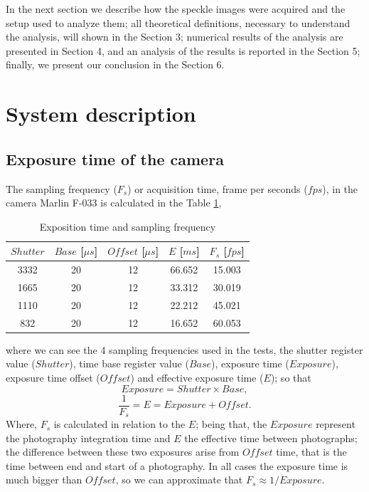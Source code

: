 \documentclass[review]{elsarticle}
\begin{document}
In the next section we describe how the speckle images were acquired and the setup used to analyze them; 
all theoretical definitions, necessary to understand the analysis, will shown in the Section 3;
numerical results of the analysis  are presented in Section 4, and
an analysis of the results is reported in the Section 5; finally, we present our
conclusion in the Section 6.

\section{System description}
\label{sec:description}




\subsection{Exposure time of the camera}
\label{subsec:expositiontime}
The sampling frequency ($F_s$) or acquisition time, frame per seconds ($fps$), 
in the camera Marlin F-033 is calculated in the 
 Table \ref{table:1}, 
\begin{table}[h!]
\centering
\begin{tabular}{||c c c c c||} 
 \hline
 $Shutter$ &  $Base$ [$\mu s$] & $Offset$ [$\mu s$] & $E$ [$ms$] & $F_s$ [$fps$]\\ [0.5ex] 
 \hline\hline
 3332  & 20  & 12  & 66.652  & 15.003  \\ 
 1665  & 20  & 12  & 33.312  & 30.019  \\ 
 1110  & 20  & 12  & 22.212  & 45.021  \\ 
 832   & 20  & 12  & 16.652  & 60.053  \\ [1ex] 
 \hline
\end{tabular}
\caption{Exposition time and sampling frequency}
\label{table:1}
\end{table}
where we can see the 4 sampling frequencies used in the tests, the shutter register value ($Shutter$), 
time base register value ($Base$),
exposure time ($Exposure$),
exposure time offset ($Offset$) and
effective exposure time ($E$); so that 
\begin{equation}
Exposure= Shutter \times Base,
\end{equation}
\begin{equation}
\frac{1}{F_s}=E= Exposure + Offset.
\end{equation}
Where,  $F_s$ is calculated in relation to the  $E$; being that,
the $Exposure$ represent the photography integration time and $E$ the effective time
between photographs; 
the difference between these two exposures arise from $Offset$ time, 
that is the time between end and start of a photography.
In all cases the exposure time is much bigger than $Offset$, so we can approximate
that $F_s\approx 1/Exposure$.
\end{document}
